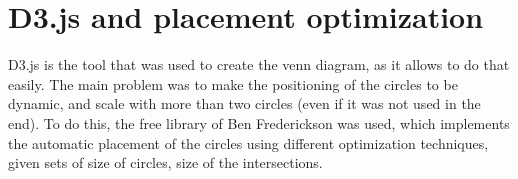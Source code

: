 \section{D3.js and placement optimization}
D3.js is the tool that was used to create the venn diagram, as it allows to do that easily. The main problem was to make the positioning of the circles to be dynamic, and scale with more than two circles (even if it was not used in the end). To do this, the free library of Ben Frederickson was used, which implements the automatic placement of the circles using different optimization techniques, given sets of size of circles, size of the intersections.\\